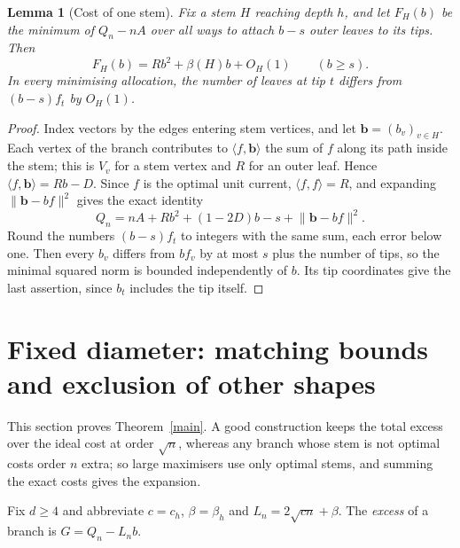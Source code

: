 \documentclass[11pt,a4paper]{article}
\newtheorem{lemma}[theorem]{Lemma}
\theoremstyle{remark}
\newcommand{\norm}[1]{\lVert #1\rVert}
\begin{document}
\begin{lemma}[Cost of one stem]\label{one}
Fix a stem $H$ reaching depth $h$, and let $F_H(b)$ be the minimum of $Q_n-nA$ over all ways to attach $b-s$ outer leaves to its tips. Then
\begin{equation}
 F_H(b)=R b^2+\beta(H)b+O_H(1)\qquad(b\ge s). \label{exp}
\end{equation}
In every minimising allocation, the number of leaves at tip $t$ differs from $(b-s)f_t$ by $O_H(1)$.
\end{lemma}
\begin{proof}
Index vectors by the edges entering stem vertices, and let $\mathbf b=(b_v)_{v\in H}$. Each vertex of the branch contributes to $\langle f,\mathbf b\rangle$ the sum of $f$ along its path inside the stem; this is $V_v$ for a stem vertex and $R$ for an outer leaf. Hence $\langle f,\mathbf b\rangle=Rb-D$. Since $f$ is the optimal unit current, $\langle f,f\rangle=R$, and expanding $\norm{\mathbf b-bf}^2$ gives the exact identity
\begin{equation}
 Q_n=nA+Rb^2+(1-2D)b-s+\norm{\mathbf b-bf}^2. \label{exact}
\end{equation}
Round the numbers $(b-s)f_t$ to integers with the same sum, each error below one. Then every $b_v$ differs from $bf_v$ by at most $s$ plus the number of tips, so the minimal squared norm is bounded independently of $b$. Its tip coordinates give the last assertion, since $b_t$ includes the tip itself.
\end{proof}

\section{Fixed diameter: matching bounds and exclusion of other shapes}\label{sec:bounds}
This section proves Theorem~\ref{main}. A good construction keeps the total excess over the ideal cost at order $\sqrt n$, whereas any branch whose stem is not optimal costs order $n$ extra; so large maximisers use only optimal stems, and summing the exact costs gives the expansion.

Fix $d\ge4$ and abbreviate $c=c_h$, $\beta=\beta_h$ and $L_n=2\sqrt{cn}+\beta$. The \emph{excess} of a branch is $G=Q_n-L_nb$.
\end{document}
